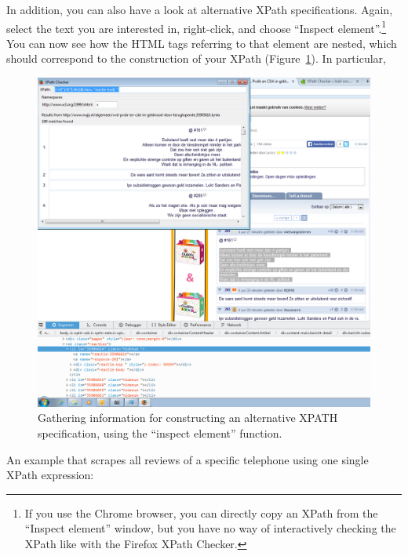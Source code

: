 \documentclass[a4paper,12pt]{book}
\renewcommand{\texttt}[1]{%
  \begingroup
  \ttfamily
  \begingroup\lccode`~=`/\lowercase{\endgroup\def~}{/\discretionary{}{}{}}%
  \begingroup\lccode`~=`[\lowercase{\endgroup\def~}{[\discretionary{}{}{}}%
  \begingroup\lccode`~=`.\lowercase{\endgroup\def~}{.\discretionary{}{}{}}%
  \begingroup\lccode`~=`(\lowercase{\endgroup\def~}{(\discretionary{}{}{}}%
  \catcode`/=\active\catcode`[=\active\catcode`.=\active\catcode`(=\active
  \scantokens{#1\noexpand}%
  \endgroup
}
\begin{document}
In addition, you can also have a look at alternative XPath specifications. Again, select the text you are interested in, right-click, and choose ``Inspect element''.\footnote{If you use the Chrome browser, you can directly copy an XPath from the ``Inspect element'' window, but you have no way of interactively checking the XPath like with the Firefox XPath Checker.} You can now see how the HTML tags referring to that element are nested, which should correspond to the construction of your XPath (Figure~\ref{fig:inspectelement}). In particular,


\begin{figure}[h]
	\centering
	\includegraphics[width=\textwidth,keepaspectratio]{../pictures/inspectelementcrop}
	\caption{\label{fig:inspectelement}Gathering information for constructing an alternative XPATH specification, using the ``inspect element'' function.}
\end{figure}


An example that scrapes all reviews of a specific telephone using one single XPath expression:
\end{document}
